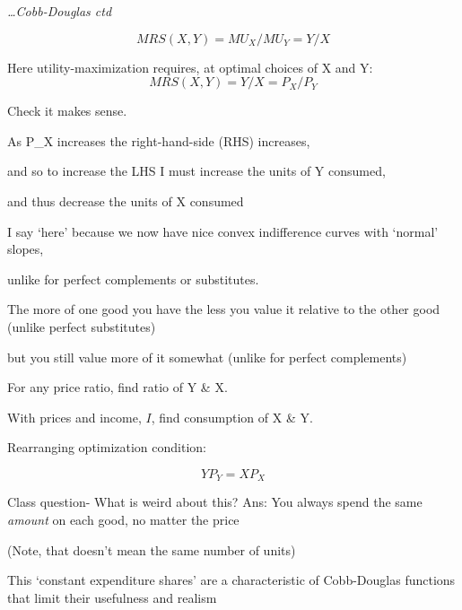 \documentclass[table]{beamer}
\begin{document}
\begin{frame}

\emph{\ldots Cobb-Douglas ctd}

\[MRS(X,Y)= MU_X/MU_Y = Y/X\]

Here utility-maximization requires, at optimal choices of X and Y:
\[MRS(X,Y)= Y/X = P_X/P_Y\]

Check it makes sense.

As P\_X increases the right-hand-side (RHS) increases,

and so to increase the LHS I must increase the units of Y consumed,

and thus decrease the units of X consumed

I say `here' because we now have nice convex indifference curves with
`normal' slopes,

unlike for perfect complements or substitutes.

The more of one good you have the less you value it relative to the
other good (unlike perfect substitutes)

but you still value more of it somewhat (unlike for perfect complements)

For any price ratio, find ratio of Y \& X.

With prices and income, \(I\), find consumption of X \& Y.

Rearranging optimization condition:

\[Y P_Y = X P_X\]

Class question- What is weird about this? Ans: You always spend the same
\emph{amount} on each good, no matter the price

(Note, that doesn't mean the same number of units)

This `constant expenditure shares' are a characteristic of Cobb-Douglas
functions that limit their usefulness and realism

\end{frame}
\end{document}
